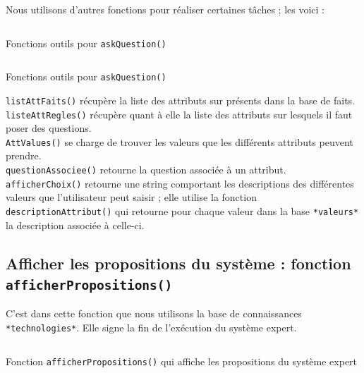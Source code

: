 \documentclass[a4paper,12pt]{article}
\begin{document}
Nous utilisons d'autres fonctions pour réaliser certaines tâches ; les voici : 

\begin{listing}[H]
	\centering
	\inputminted[breaklines=true,linenos, firstline = 24,lastline = 71]{lisp}{../askQuestion.lisp}
	\caption{Fonctions outils pour \texttt{askQuestion()}}
\end{listing}

\begin{listing}[H]
	\centering
	\inputminted[breaklines=true,linenos, firstline = 73]{lisp}{../askQuestion.lisp}
	\caption{Fonctions outils pour \texttt{askQuestion()}}
\end{listing}

\texttt{listAttFaits()} récupère la liste des attributs sur présents dans la base de faits.\\

\texttt{listeAttRegles()} récupère quant à elle la liste des attributs sur lesquels il faut poser des questions.\\

\texttt{AttValues()} se charge de trouver les valeurs que les différents attributs peuvent prendre.\\

\texttt{questionAssociee()} retourne la question associée à un attribut.
\texttt{afficherChoix()} retourne une string comportant les descriptions des différentes valeurs que l'utilisateur peut saisir ; elle utilise la fonction
\texttt{descriptionAttribut()} qui retourne pour chaque valeur dans la base \texttt{*valeurs*} la description associée à celle-ci.



\subsection{Afficher les propositions du système : fonction \texttt{afficherPropositions()}}

	C'est dans cette fonction que nous utilisons la base de connaissances \texttt{*technologies*}. Elle signe la fin de l'exécution du système expert.

\begin{listing}[H]
	\centering
	\inputminted[breaklines=true,linenos,lastline=9]{lisp}{../afficherPropositions.lisp}
	\caption{Fonction \texttt{afficherPropositions()} qui affiche les propositions du système expert}
\end{listing}
\end{document}
